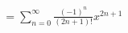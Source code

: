 \documentclass[preview]{standalone}
\begin{document}
\begin{align*}
=\sum_{n=0}^{\infty} \frac{(-1)^n}{(2 n+1) !} x^{2 n+1}
\end{align*}
\end{document}

